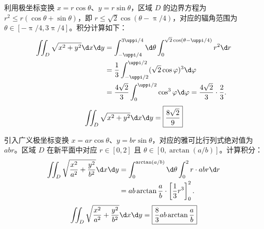 \begin{solution}

    利用极坐标变换 $x = r \cos \theta$、$y = r \sin \theta$，区域 $D$ 的边界方程为 $r^2 \leqslant r(\cos \theta + \sin \theta)$，即 $r \leqslant \sqrt{2} \cos(\theta - \uppi/4)$，对应的辐角范围为 $\theta \in [-\uppi/4, 3\uppi/4]$。积分计算如下：
    \begin{equation}
        \begin{aligned}
            \iint_D \sqrt{x^2+y^2} \d x \d y & = \int_{-\uppi/4}^{3\uppi/4} \d \theta \int_0^{\sqrt{2}\cos(\theta - \uppi/4)} r^2 \d r                   \\
                                             & = \frac{1}{3} \int_{-\uppi/2}^{\uppi/2} (\sqrt{2}\cos \varphi)^3 \d \varphi \label{eq:int-1-step}         \\
                                             & = \frac{4\sqrt{2}}{3} \int_0^{\uppi/2} \cos^3 \varphi \d \varphi = \frac{4\sqrt{2}}{3} \cdot \frac{2}{3}.
        \end{aligned}
    \end{equation}
    \begin{equation}
        \iint_D \sqrt{x^2+y^2} \d x \d y = \boxed{\frac{8\sqrt{2}}{9}}
    \end{equation}


    引入广义极坐标变换 $x = ar\cos\theta$、$y = br\sin\theta$，对应的雅可比行列式绝对值为 $abr$。区域 $D$ 在新平面中对应 $r \in [0, 2]$ 且 $\theta \in [0, \arctan(a/b)]$。计算积分：
    \begin{equation}
        \begin{aligned}
            \iint_D \sqrt{\frac{x^2}{a^2} + \frac{y^2}{b^2}} \d x \d y & = \int_0^{\arctan(a/b)} \d \theta \int_0^2 r \cdot abr \d r      \\
                                                                       & = ab \arctan\frac{a}{b} \cdot \left[ \frac{1}{3}r^3 \right]_0^2.
        \end{aligned}
    \end{equation}
    \begin{equation}
        \iint_D \sqrt{\frac{x^2}{a^2} + \frac{y^2}{b^2}} \d x \d y = \boxed{\frac{8}{3}ab \arctan\frac{a}{b}}
    \end{equation}



\end{solution}
